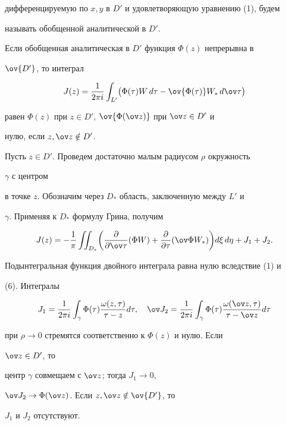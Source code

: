 дифференцируемую по $x,y$ в $D'$ и удовлетворяющую уравнению (1), будем 


называть обобщенной аналитической в $D'$. 


 


\begin{lemnonum} 


Если обобщенная аналитическая в $D'$ функция $\Phi(z)$ непрерывна в 


$\ov{D'}$, то интеграл 


\begin{equation} 


J(z)=\frac{1}{2\pi i}\int_{L'}\bigl(\Phi(\tau)W\,d\tau- 


\ov{\Phi(\tau)}W_*\,d\ov\tau\bigr) 


\end{equation} 


равен $\Phi(z)$ при $z\in D'$, $\ov{\Phi(\ov z)}$ при $\ov z\in D'$ и 


нулю, если $z,\ov z\notin D'$. 


\end{lemnonum} 


 


\begin{pf} 


Пусть $z\in D'$. Проведем достаточно малым радиусом $\rho$ окружность 


$\gamma$ с центром 


в точке $z$. Обозначим через $D_*$ область, заключенную между $L'$ и 


$\gamma$. Применяя к $D_*$ формулу Грина, получим 


$$ 


J(z)=-\frac{1}{\pi}\iint_{D_*}\biggl( 


\frac{\partial}{\partial\ov \tau}(\Phi W)+ 


\frac{\partial}{\partial\tau}(\ov\Phi W_*)\biggr)d\xi\,d\eta 


+J_1+J_2. 


$$ 


Подынтегральная функция двойного интеграла равна нулю вследствие (1) и 


(6). Интегралы 


$$ 


J_1=\frac{1}{2\pi i}\int_\gamma\Phi(\tau) 


\frac{\omega(z,\tau)}{\tau-z}d\tau,\quad 


\ov J_2=\frac{1}{2\pi i}\int_\gamma\Phi(\tau) 


\frac{\omega(\ov z,\tau)}{\tau-\ov z}d\tau 


$$ 


при $\rho\to 0$ стремятся соответственно к $\Phi(z)$ и нулю. Если 


$\ov z\in D'$, то 


центр $\gamma$ совмещаем с $\ov z$; тогда $J_1\to 0$, 


$\ov J_2\to\Phi(\ov z)$. Если $z,\ov z\notin\ov{D'}$, то 


$J_1$ и $J_2$ отсутствуют. 


\end{pf} 


